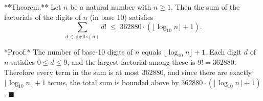 **Theorem.** Let $n$ be a natural number with $n \geq 1$. Then the sum of the factorials of the digits of $n$ (in base 10) satisfies $$\sum_{d \,\in\, \text{digits}(n)} d! \;\leq\; 362880 \cdot (\lfloor \log_{10} n \rfloor + 1).$$

*Proof.* The number of base-10 digits of $n$ equals $\lfloor \log_{10} n \rfloor + 1$. Each digit $d$ of $n$ satisfies $0 \leq d \leq 9$, and the largest factorial among these is $9! = 362880$. Therefore every term in the sum is at most $362880$, and since there are exactly $\lfloor \log_{10} n \rfloor + 1$ terms, the total sum is bounded above by $362880 \cdot (\lfloor \log_{10} n \rfloor + 1)$. $\blacksquare$